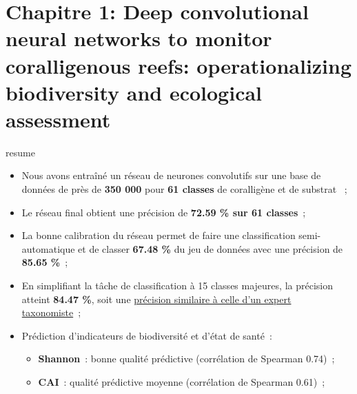 \chapter[Deep convolutional neural networks to monitor coralligenous reefs: operationalizing biodiversity and ecological assessment]{Chapitre 1: Deep convolutional neural networks to monitor coralligenous reefs: operationalizing biodiversity and ecological assessment} \label{chapitre1-deep}

\pagestyle{main}

\begin{center}
\end{center}

\begin{center}
\begin{colbox}{resume}
  \vspace{-2pt}
{\color{textresume}\small
\begin{itemize}[leftmargin=0in]\itemsep3pt
\item Nous avons entraîné un réseau de neurones convolutifs sur une base de données de près de \textbf{350 000} pour \textbf{61 classes} de coralligène et de substrat ~;
\item Le réseau final obtient une précision de \textbf{72.59 \% sur 61 classes}~;
\item La bonne calibration du réseau permet de faire une classification semi-automatique et de classer \textbf{67.48 \%} du jeu de données avec une précision de \textbf{85.65 \%}~;
\item En simplifiant la tâche de classification à 15 classes majeures, la précision atteint \textbf{84.47 \%}, soit une \underline{précision similaire à celle d'un expert taxonomiste}~;
\item Prédiction d'indicateurs de biodiversité et d'état de santé~:
\begin{itemize}
  \item \textbf{Shannon}~: bonne qualité prédictive (corrélation de Spearman 0.74)~;
  \item \textbf{CAI}~: qualité prédictive moyenne (corrélation de Spearman 0.61)~;
\end{itemize}
\end{itemize}
}
\vspace{-2pt}
\end{colbox}
\end{center}

